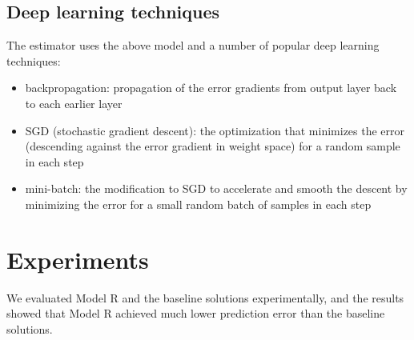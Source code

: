\documentclass[letterpaper]{article}
\begin{document}
\subsection{Deep learning techniques}
The estimator uses the above model and a number of popular deep learning 
techniques:
\begin{itemize}
	\item backpropagation: propagation of the error gradients from output layer 
	back to each earlier layer \cite{rumelhart1988learning}
	\item SGD (stochastic gradient descent): the optimization that minimizes 
	the error (descending against the error gradient in weight space) for a 
	random sample in each step \cite{lecun2012efficient}
	\item mini-batch: the modification to SGD to accelerate and smooth the 
	descent by minimizing the error for a small random batch of samples in 
	each step \cite{mairal2010online}
\end{itemize}

\section{Experiments}
We evaluated Model R and the baseline solutions experimentally,
and the results showed that Model R achieved much lower prediction error than 
the baseline solutions.
\end{document}

